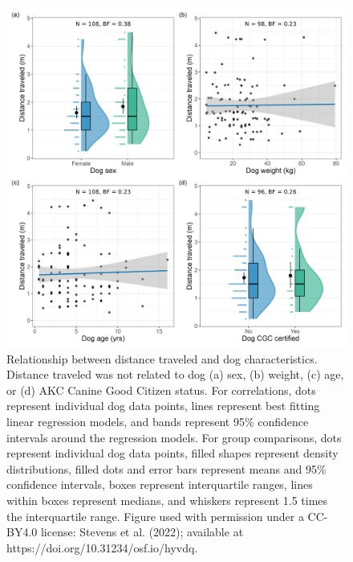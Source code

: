 \documentclass[
  pub,floatsintext]{apa6}
\begin{document}
\begin{figure}

{\centering \includegraphics[width=0.95\linewidth]{figures/dog_characteristics} 

}

\caption{Relationship between distance traveled and dog characteristics. Distance traveled was not related to dog (a) sex, (b) weight, (c) age, or (d) AKC Canine Good Citizen status. For correlations, dots represent individual dog data points, lines represent best fitting linear regression models, and bands represent 95\% confidence intervals around the regression models. For group comparisons, dots represent individual dog data points, filled shapes represent density distributions, filled dots and error bars represent means and 95\% confidence intervals, boxes represent interquartile ranges, lines within boxes represent medians, and whiskers represent 1.5 times the interquartile range.  Figure used with permission under a CC-BY4.0 license: Stevens et al. (2022); available at https://doi.org/10.31234/osf.io/hyvdq.}\label{fig:dog-char}
\end{figure}
\end{document}
